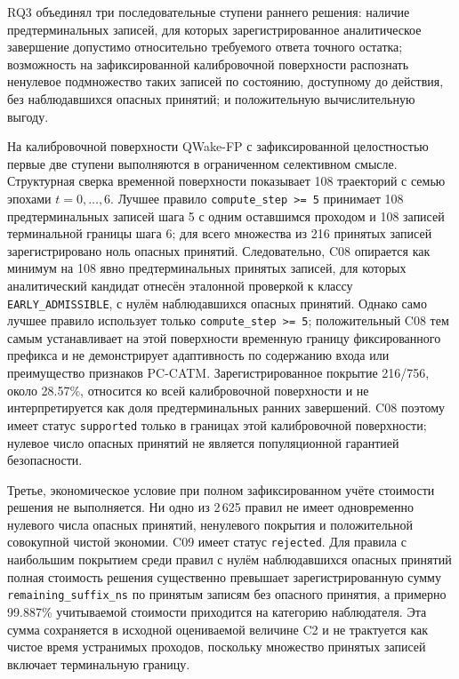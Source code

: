 RQ3 объединял три последовательные ступени раннего решения: наличие
предтерминальных записей, для которых зарегистрированное аналитическое
завершение допустимо относительно требуемого ответа точного остатка;
возможность на зафиксированной калибровочной поверхности распознать
ненулевое подмножество таких записей по состоянию, доступному до действия, без наблюдавшихся опасных
принятий; и положительную вычислительную выгоду.

На калибровочной поверхности QWake-FP с зафиксированной целостностью первые две
ступени выполняются в ограниченном селективном смысле. Структурная сверка
временной поверхности показывает 108 траекторий с семью эпохами $t=0,\ldots,6$.
Лучшее правило \texttt{compute\_step >= 5} принимает 108 предтерминальных
записей шага 5 с одним оставшимся проходом и 108 записей терминальной границы
шага 6; для всего множества из 216 принятых записей зарегистрировано ноль
опасных принятий. Следовательно, C08 опирается как минимум на 108 явно
предтерминальных принятых записей, для которых аналитический кандидат отнесён
эталонной проверкой к классу \texttt{EARLY\_ADMISSIBLE}, с нулём наблюдавшихся
опасных принятий. Однако само лучшее правило использует только
\texttt{compute\_step >= 5}; положительный C08 тем самым устанавливает на этой
поверхности временную границу фиксированного префикса и не демонстрирует
адаптивность по содержанию входа или преимущество признаков PC-CATM.
Зарегистрированное покрытие 216/756, около 28.57\%, относится ко всей
калибровочной поверхности и не интерпретируется как доля предтерминальных
ранних завершений. C08 поэтому имеет статус \texttt{supported} только в
границах этой калибровочной поверхности; нулевое число опасных принятий не
является популяционной гарантией безопасности.

Третье, экономическое условие при полном зафиксированном учёте стоимости
решения не выполняется. Ни одно из 2\,625 правил не имеет одновременно
нулевого числа опасных принятий, ненулевого покрытия и положительной совокупной
чистой экономии. C09 имеет статус \texttt{rejected}. Для правила с наибольшим
покрытием среди правил с нулём наблюдавшихся опасных принятий полная
стоимость решения существенно превышает зарегистрированную сумму
\texttt{remaining\_suffix\_ns} по принятым записям без опасного принятия, а примерно
99.887\% учитываемой стоимости приходится на категорию наблюдателя. Эта сумма
сохраняется в исходной оцениваемой величине C2 и не трактуется как чистое время
устранимых проходов, поскольку множество принятых записей включает терминальную
границу.

